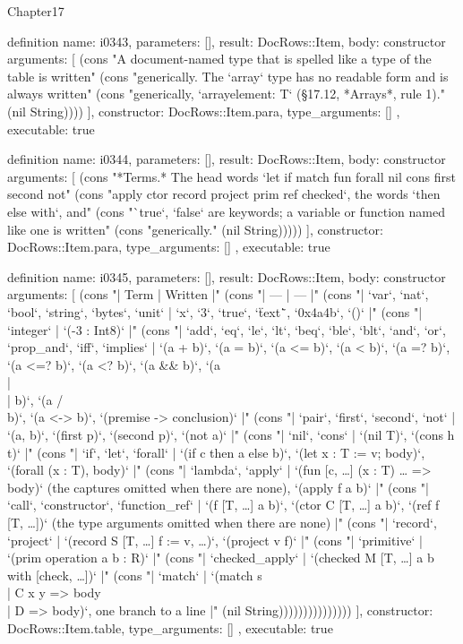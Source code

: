 \begin{lexlean}{Chapter17}
\begin{semanticmodule}
definition{
  name: i0343,
  parameters: [],
  result: DocRows::Item,
  body: constructor{
    arguments: [
      (cons "A document-named type that is spelled like a type of the table is written" (cons "generically. The `array` type has no readable form and is always written" (cons "generically, `array{element: T}` (§17.12, *Arrays*, rule 1)." (nil String))))
    ],
    constructor: DocRows::Item.para,
    type_arguments: []
  },
  executable: true
}

definition{
  name: i0344,
  parameters: [],
  result: DocRows::Item,
  body: constructor{
    arguments: [
      (cons "*Terms.* The head words `let if match fun forall nil cons first second not" (cons "apply ctor record project prim ref checked`, the words `then else with`, and" (cons "`true`, `false` are keywords; a variable or function named like one is written" (cons "generically." (nil String)))))
    ],
    constructor: DocRows::Item.para,
    type_arguments: []
  },
  executable: true
}

definition{
  name: i0345,
  parameters: [],
  result: DocRows::Item,
  body: constructor{
    arguments: [
      (cons "| Term | Written |" (cons "| --- | --- |" (cons "| `var`, `nat`, `bool`, `string`, `bytes`, `unit` | `x`, `3`, `true`, `\"text\"`, `0x4a4b`, `()` |" (cons "| `integer` | `(-3 : Int8)` |" (cons "| `add`, `eq`, `le`, `lt`, `beq`, `ble`, `blt`, `and`, `or`, `prop_and`, `iff`, `implies` | `(a + b)`, `(a = b)`, `(a <= b)`, `(a < b)`, `(a =? b)`, `(a <=? b)`, `(a <? b)`, `(a && b)`, `(a \\|\\| b)`, `(a /\\ b)`, `(a <-> b)`, `(premise -> conclusion)` |" (cons "| `pair`, `first`, `second`, `not` | `(a, b)`, `(first p)`, `(second p)`, `(not a)` |" (cons "| `nil`, `cons` | `(nil T)`, `(cons h t)` |" (cons "| `if`, `let`, `forall` | `(if c then a else b)`, `(let x : T := v; body)`, `(forall (x : T), body)` |" (cons "| `lambda`, `apply` | `(fun [c, …] (x : T) … => body)` (the captures omitted when there are none), `(apply f a b)` |" (cons "| `call`, `constructor`, `function_ref` | `(f [T, …] a b)`, `(ctor C [T, …] a b)`, `(ref f [T, …])` (the type arguments omitted when there are none) |" (cons "| `record`, `project` | `(record S [T, …] {f := v, …})`, `(project v f)` |" (cons "| `primitive` | `(prim operation a b : R)` |" (cons "| `checked_apply` | `(checked M [T, …] a b with [check, …])` |" (cons "| `match` | `(match s \\| C x y => body \\| D => body)`, one branch to a line |" (nil String)))))))))))))))
    ],
    constructor: DocRows::Item.table,
    type_arguments: []
  },
  executable: true
}


\end{semanticmodule}
\end{lexlean}

